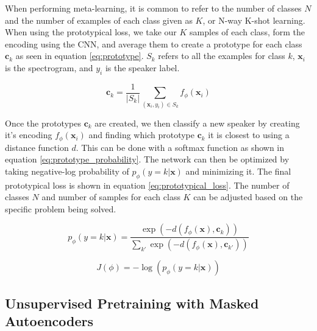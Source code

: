 \documentclass{article}
\begin{document}
When performing meta-learning, it is common to refer to the number of classes $N$ and the number of examples of each class
given as $K$, or N-way K-shot learning. When using the prototypical loss, we take our $K$ samples of each class, form the
encoding using the CNN, and average them to create a prototype for each class $\mathbf{c}_k$ as seen in equation \ref{eq:prototype}.
$S_k$ refers to all the examples for class $k$, $\mathbf{x}_i$ is the spectrogram, and $y_i$ is the speaker label.

\begin{equation}
  \mathbf{c}_k = \frac{1}{|S_k|} \sum_{\left(\mathbf{x}_i, y_i\right) \in S_k} f_\phi\left(\mathbf{x}_i\right)
  \label{eq:prototype}
\end{equation}

Once the prototypes $\mathbf{c}_k$ are created, we then classify a new speaker by creating it's encoding 
$f_\phi\left(\mathbf{x}_i\right)$ and finding which prototype $\mathbf{c}_k$ it is closest to using a distance function
$d$. This can be done with a softmax function as shown in equation \ref{eq:prototype_probability}. The network can then 
be optimized by taking negative-log probability of $p_\phi\left(y=k | \mathbf{x}\right)$ and minimizing it. The final
prototypical loss is shown in equation \ref{eq:prototypical_loss}. The number of classes $N$ and number of samples for
each class $K$ can be adjusted based on the specific problem being solved.

\begin{equation}
  p_\phi\left(y=k | \mathbf{x}\right) = \frac{\exp\left(-d\left(f_\phi\left(\mathbf{x}\right), \mathbf{c}_k\right)\right)}{\sum_{k'} \exp\left(-d\left(f_\phi\left(\mathbf{x}\right), \mathbf{c}_{k'}\right)\right) }
  \label{eq:prototype_probability}
\end{equation}

\begin{equation}
  J\left(\phi\right) = - \log \left(p_\phi\left(y=k | \mathbf{x}\right)\right)
  \label{eq:prototypical_loss}
\end{equation}

\subsection{Unsupervised Pretraining with Masked Autoencoders}


\end{document}
